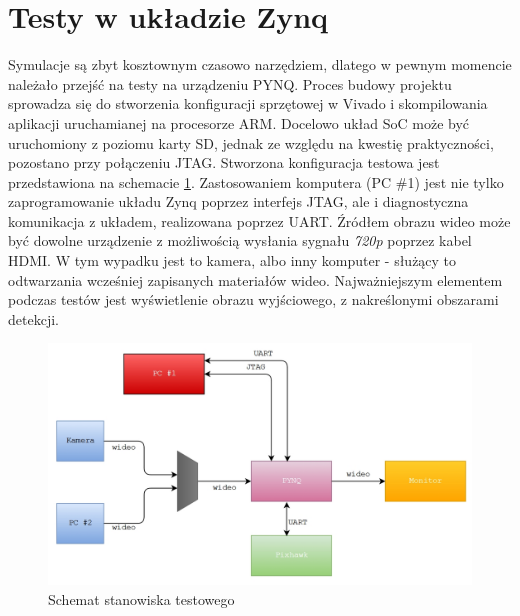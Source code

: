 \section{Testy w układzie Zynq} %

Symulacje są zbyt kosztownym czasowo narzędziem, dlatego w pewnym momencie należało przejść na testy na urządzeniu PYNQ. 
Proces budowy projektu sprowadza się do stworzenia konfiguracji sprzętowej w Vivado i skompilowania aplikacji uruchamianej na procesorze ARM. %
Docelowo układ SoC może być uruchomiony z poziomu karty SD, jednak ze względu na kwestię praktyczności, pozostano przy połączeniu JTAG. 
Stworzona konfiguracja testowa jest przedstawiona na schemacie \ref{fig:testing_setup}. Zastosowaniem komputera (PC \#1) jest nie tylko zaprogramowanie układu Zynq poprzez interfejs JTAG, ale i diagnostyczna komunikacja z układem, realizowana poprzez UART. %
Źródłem obrazu wideo może być dowolne urządzenie z możliwością wysłania sygnału \textit{720p} poprzez kabel HDMI. W tym wypadku jest to kamera, albo inny komputer - służący to odtwarzania wcześniej zapisanych materiałów wideo. Najważniejszym elementem podczas testów jest wyświetlenie obrazu wyjściowego, z nakreślonymi obszarami detekcji.
\begin{figure}[h]
	\centering
	\includegraphics[width=14cm]{6_testing_setup.jpg}
	\caption{Schemat stanowiska testowego}
	\label{fig:testing_setup}
\end{figure}

